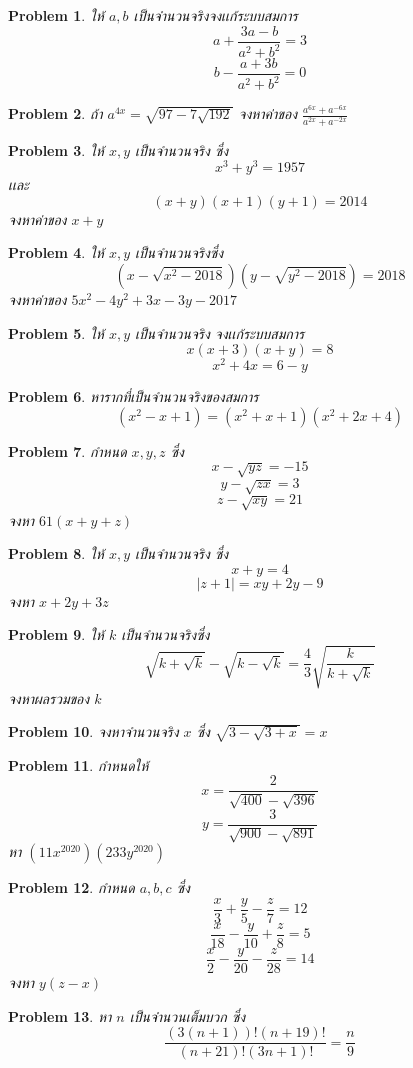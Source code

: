 \documentclass[a4paper,12pt]{article}
\newtheorem{problem}{Problem}
\begin{document}
	\begin{problem}
		ให้ $a,b$ เป็นจำนวนจริงจงเเก้ระบบสมการ
		$$a+\frac{3a-b}{a^2+b^2}=3$$
		$$b-\frac{a+3b}{a^2+b^2}=0$$ 
	\end{problem}
	\begin{problem}
		ถ้า $a^{4x} = \sqrt{97-7\sqrt{192}}$ จงหาค่าของ
		$\frac{a^{6x}+a^{-6x}}{a^{2x}+a^{-2x}}$
	\end{problem}
	\begin{problem}
		ให้ $x,y$ เป็นจำนวนจริง ซึ่ง $$x^3+y^3=1957$$เเละ
		$$(x+y)(x+1)(y+1)=2014$$ จงหาค่าของ $x+y$
	\end{problem}
	\begin{problem}
		ให้ $x,y$ เป็นจำนวนจริงซึ่ง $$(x-\sqrt{x^2-2018})(y-\sqrt{y^2-2018})=2018$$ จงหาค่าของ $5x^2-4y^2+3x-3y-2017$
	\end{problem}
	\begin{problem}
		ให้ $x,y$ เป็นจำนวนจริง จงเเก้ระบบสมการ 
		$$x(x+3)(x+y)=8$$
		$$x^2+4x=6-y$$
	\end{problem}
	\begin{problem}
		หารากที่เป็นจำนวนจริงของสมการ $$(x^2-x+1)=(x^2+x+1)(x^2+2x+4)$$
	\end{problem}
	\begin{problem}
		กำหนด $x,y,z$ ซึ่ง 
		$$x-\sqrt{yz}=-15 $$
		$$y-\sqrt{zx}=3 $$
		$$z-\sqrt{xy}=21$$
		จงหา $61(x+y+z)$
	\end{problem}
	\begin{problem}
		ให้ $x,y$ เป็นจำนวนจริง ซึ่ง 
		$$x+y=4$$
		$$|z+1|=xy+2y-9$$
		จงหา $x+2y+3z$
	\end{problem}
	\begin{problem}
		ให้ $k$ เป็นจำนวนจริงซึ่ง 
		$$\sqrt{k+\sqrt{k}}- \sqrt{k-\sqrt{k}}=\frac{4}{3}\sqrt{\frac{k}{k+\sqrt{k}}}$$ 
		จงหาผลรวมของ $k$
	\end{problem}
	\begin{problem}
		จงหาจำนวนจริง $x$ ซึ่ง $\sqrt{3-\sqrt{3+x}}=x$
	\end{problem}
	\begin{problem}
		กำหนดให้ 
		$$x=\frac{2}{\sqrt{400}-\sqrt{396}}$$
		$$y=\frac{3}{\sqrt{900}-\sqrt{891}}$$
		หา $(11x^{2020})(233y^{2020})$
	\end{problem}
	\begin{problem}
		กำหนด $a,b,c$ ซึ่ง
		$$\frac{x}{3}+\frac{y}{5}-\frac{z}{7}=12 $$
		$$\frac{x}{18}-\frac{y}{10}+\frac{z}{8}=5$$
		$$\frac{x}{2}-\frac{y}{20}-\frac{z}{28}=14$$
		จงหา $y(z-x)$
	\end{problem}
	\begin{problem}
		หา $n$ เป็นจำนวนเต็มบวก ซึ่ง
		$$\frac{(3(n+1))!(n+19)!}{(n+21)!(3n+1)!}=\frac{n}{9}$$
	\end{problem}
\end{document}
